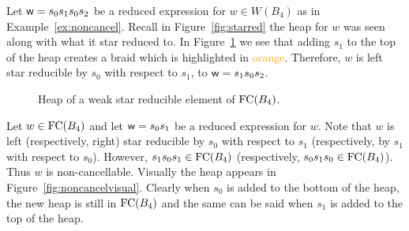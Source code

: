 \begin{example}
	Let $\mathsf{w}=s_0s_1s_0s_2$ be a reduced expression for $w \in W(B_4)$ as in Example~\ref{ex:noncancel}. Recall in Figure~\ref{fig:starred} the heap for $w$ was seen along with what it star reduced to. In Figure~\ref{fig:noncancel} we see that adding $s_1$ to the top of the heap creates a braid which is highlighted in \textcolor{orange}{orange}. Therefore, $w$ is left star reducible by $s_0$ with respect to $s_1$, to $\mathsf{w}=s_1s_0s_2$.
\end{example}
  


\begin{figure*}[h!] \centering
{}
\caption{Heap of a weak star reducible element of $\mathrm{FC}(B_4)$.} \label{fig:noncancel}
\end{figure*}

\begin{example}
Let $w \in \mathrm{FC}(B_4)$ and let $\mathsf{w}=s_0s_1$ be a reduced expression for $w$. Note that $w$ is left (respectively, right) star reducible by $s_0$ with respect to $s_1$ (respectively, by $s_1$ with respect to $s_0$). However, $s_1s_0s_1 \in \mathrm{FC}(B_4)$ (respectively, $s_0s_1s_0 \in \mathrm{FC}(B_4)$). Thus $w$ is non-cancellable. Visually the heap appears in Figure~\ref{fig:noncancelvisual}. Clearly when $s_0$ is added to the bottom of the heap, the new heap is still in $\mathrm{FC}(B_4)$ and the same can be said when $s_1$ is added to the top of the heap.
\end{example}

